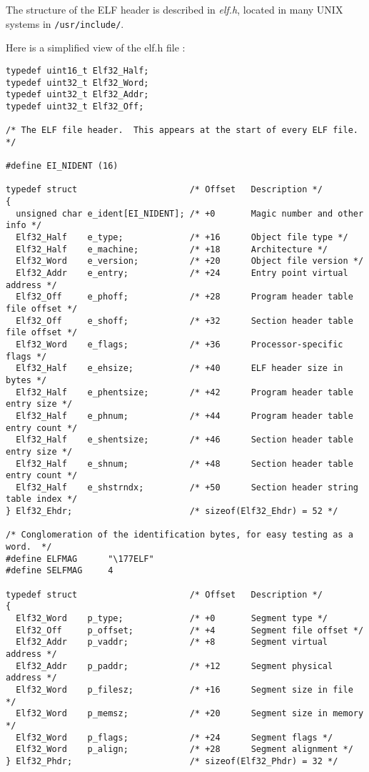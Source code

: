 The structure of the ELF header is described in \emph{elf.h}, located in many
UNIX systems in \verb+/usr/include/+.

Here is a simplified view of the elf.h file :

\begin{verbatim}
typedef uint16_t Elf32_Half;
typedef uint32_t Elf32_Word;
typedef uint32_t Elf32_Addr;
typedef uint32_t Elf32_Off;

/* The ELF file header.  This appears at the start of every ELF file.  */

#define EI_NIDENT (16)

typedef struct                      /* Offset   Description */
{
  unsigned char e_ident[EI_NIDENT]; /* +0       Magic number and other info */
  Elf32_Half    e_type;             /* +16      Object file type */
  Elf32_Half    e_machine;          /* +18      Architecture */
  Elf32_Word    e_version;          /* +20      Object file version */
  Elf32_Addr    e_entry;            /* +24      Entry point virtual address */
  Elf32_Off     e_phoff;            /* +28      Program header table file offset */
  Elf32_Off     e_shoff;            /* +32      Section header table file offset */
  Elf32_Word    e_flags;            /* +36      Processor-specific flags */
  Elf32_Half    e_ehsize;           /* +40      ELF header size in bytes */
  Elf32_Half    e_phentsize;        /* +42      Program header table entry size */
  Elf32_Half    e_phnum;            /* +44      Program header table entry count */
  Elf32_Half    e_shentsize;        /* +46      Section header table entry size */
  Elf32_Half    e_shnum;            /* +48      Section header table entry count */
  Elf32_Half    e_shstrndx;         /* +50      Section header string table index */
} Elf32_Ehdr;                       /* sizeof(Elf32_Ehdr) = 52 */

/* Conglomeration of the identification bytes, for easy testing as a word.  */
#define	ELFMAG		"\177ELF"
#define	SELFMAG		4

typedef struct                      /* Offset   Description */
{
  Elf32_Word    p_type;             /* +0       Segment type */
  Elf32_Off     p_offset;           /* +4       Segment file offset */
  Elf32_Addr    p_vaddr;            /* +8       Segment virtual address */
  Elf32_Addr    p_paddr;            /* +12      Segment physical address */
  Elf32_Word    p_filesz;           /* +16      Segment size in file */
  Elf32_Word    p_memsz;            /* +20      Segment size in memory */
  Elf32_Word    p_flags;            /* +24      Segment flags */
  Elf32_Word    p_align;            /* +28      Segment alignment */
} Elf32_Phdr;                       /* sizeof(Elf32_Phdr) = 32 */
\end{verbatim}

